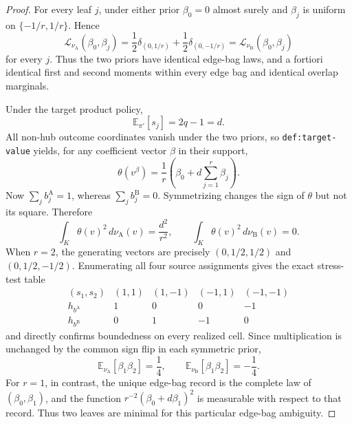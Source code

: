 \documentclass{article}
\begin{document}
\begin{proof}
For every leaf \(j\), under either prior \(\beta_0=0\) almost surely and \(\beta_j\) is uniform on \(\{-1/r,1/r\}\).  Hence
\[
 \mathcal L_{\nu_{\mathrm A}}(\beta_0,\beta_j)
 =\frac12\delta_{(0,1/r)}+\frac12\delta_{(0,-1/r)}
 =\mathcal L_{\nu_{\mathrm B}}(\beta_0,\beta_j)
\]
for every \(j\).  Thus the two priors have identical edge-bag laws, and a fortiori identical first and second moments within every edge bag and identical overlap marginals.

Under the target product policy,
\[
 \mathbb E_{\pi'}[s_j]=2q-1=d.
\]
All non-hub outcome coordinates vanish under the two priors, so \texttt{def:target-value} yields, for any coefficient vector \(\beta\) in their support,
\[
 \theta(v^\beta)=\frac1r\left(\beta_0+d\sum_{j=1}^r\beta_j\right).
\]
Now \(\sum_jb_j^{\mathrm A}=1\), whereas \(\sum_jb_j^{\mathrm B}=0\).  Symmetrizing changes the sign of \(\theta\) but not its square.  Therefore
\[
 \int_K\theta(v)^2\,d\nu_{\mathrm A}(v)=\frac{d^2}{r^2},
 \qquad
 \int_K\theta(v)^2\,d\nu_{\mathrm B}(v)=0.
\]
When \(r=2\), the generating vectors are precisely \((0,1/2,1/2)\) and \((0,1/2,-1/2)\).  Enumerating all four source assignments gives the exact stress-test table
\[
\begin{array}{c|rrrr}
 (s_1,s_2)&(1,1)&(1,-1)&(-1,1)&(-1,-1)\\ \hline
 h_{b^{\mathrm A}}&1&0&0&-1\\
 h_{b^{\mathrm B}}&0&1&-1&0
\end{array}
\]
and directly confirms boundedness on every realized cell.  Since multiplication is unchanged by the common sign flip in each symmetric prior,
\[
 \mathbb E_{\nu_{\mathrm A}}[\beta_1\beta_2]=\frac14,
 \qquad
 \mathbb E_{\nu_{\mathrm B}}[\beta_1\beta_2]=-\frac14.
\]
For \(r=1\), in contrast, the unique edge-bag record is the complete law of \((\beta_0,\beta_1)\), and the function \(r^{-2}(\beta_0+d\beta_1)^2\) is measurable with respect to that record.  Thus two leaves are minimal for this particular edge-bag ambiguity.


\end{proof}
\end{document}
